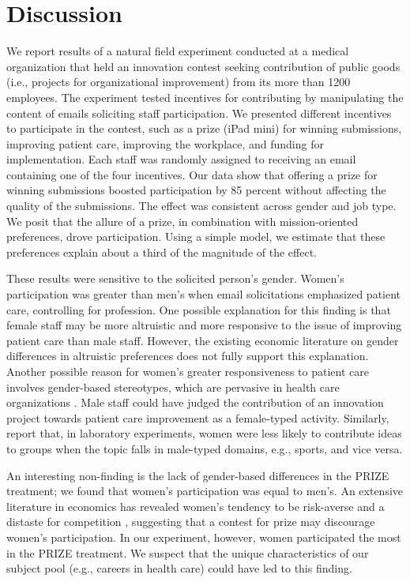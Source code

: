 \documentclass[11pt, titlepage]{article}
\begin{document}
\section{Discussion}\label{discussion}

We report results of a natural field experiment conducted at a medical
organization that held an innovation contest seeking contribution of
public goods (i.e., projects for organizational improvement) from its
more than 1200 employees. The experiment tested incentives for
contributing by manipulating the content of emails soliciting staff
participation. We presented different incentives to participate in the
contest, such as a prize (iPad mini) for winning submissions, improving
patient care, improving the workplace, and funding for implementation.
Each staff was randomly assigned to receiving an email containing one of
the four incentives. Our data show that offering a prize for winning
submissions boosted participation by 85 percent without affecting the
quality of the submissions. The effect was consistent across gender and
job type. We posit that the allure of a prize, in combination with
mission-oriented preferences, drove participation. Using a simple model,
we estimate that these preferences explain about a third of the
magnitude of the effect.

These results were sensitive to the solicited person's gender. Women's
participation was greater than men's when email solicitations emphasized
patient care, controlling for profession. One possible explanation for
this finding is that female staff may be more altruistic and more
responsive to the issue of improving patient care than male staff.
However, the existing economic literature on gender differences in
altruistic preferences \citep[see][]{croson2009gender} does not fully
support this explanation. Another possible reason for women's greater
responsiveness to patient care involves gender-based stereotypes, which
are pervasive in health care organizations \citep{evans2002cautious}.
Male staff could have judged the contribution of an innovation project
towards patient care improvement as a female-typed activity. Similarly,
\citet{coffman2014evidence} report that, in laboratory experiments,
women were less likely to contribute ideas to groups when the topic
falls in male-typed domains, e.g., sports, and vice versa.

An interesting non-finding is the lack of gender-based differences in
the PRIZE treatment; we found that women's participation was equal to
men's. An extensive literature in economics has revealed women's
tendency to be risk-averse \citep{borghans2009gender} and a distaste for
competition \citep{niederle2007women}, suggesting that a contest for
prize may discourage women's participation. In our experiment, however,
women participated the most in the PRIZE treatment. We suspect that the
unique characteristics of our subject pool (e.g., careers in health
care) could have led to this finding.
\end{document}
